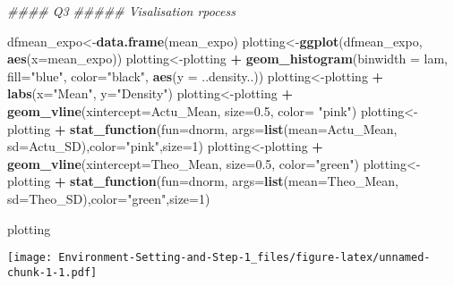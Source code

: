 \documentclass[
]{article}
\newenvironment{Shaded}{\begin{snugshade}}{\end{snugshade}}
\newcommand{\CommentTok}[1]{\textcolor[rgb]{0.56,0.35,0.01}{\textit{#1}}}
\newcommand{\DataTypeTok}[1]{\textcolor[rgb]{0.13,0.29,0.53}{#1}}
\newcommand{\DecValTok}[1]{\textcolor[rgb]{0.00,0.00,0.81}{#1}}
\newcommand{\FloatTok}[1]{\textcolor[rgb]{0.00,0.00,0.81}{#1}}
\newcommand{\KeywordTok}[1]{\textcolor[rgb]{0.13,0.29,0.53}{\textbf{#1}}}
\newcommand{\NormalTok}[1]{#1}
\newcommand{\OperatorTok}[1]{\textcolor[rgb]{0.81,0.36,0.00}{\textbf{#1}}}
\newcommand{\StringTok}[1]{\textcolor[rgb]{0.31,0.60,0.02}{#1}}
\begin{document}
\begin{Shaded}
\begin{Highlighting}[]
\CommentTok{#### Q3}
\CommentTok{##### Visalisation rpocess}

\NormalTok{dfmean_expo<-}\KeywordTok{data.frame}\NormalTok{(mean_expo)}
\NormalTok{plotting<-}\KeywordTok{ggplot}\NormalTok{(dfmean_expo, }\KeywordTok{aes}\NormalTok{(}\DataTypeTok{x=}\NormalTok{mean_expo))}
\NormalTok{plotting<-plotting }\OperatorTok{+}\StringTok{ }\KeywordTok{geom_histogram}\NormalTok{(}\DataTypeTok{binwidth =}\NormalTok{ lam, }\DataTypeTok{fill=}\StringTok{"blue"}\NormalTok{, }\DataTypeTok{color=}\StringTok{"black"}\NormalTok{, }\KeywordTok{aes}\NormalTok{(}\DataTypeTok{y =}\NormalTok{ ..density..))}
\NormalTok{plotting<-plotting }\OperatorTok{+}\StringTok{ }\KeywordTok{labs}\NormalTok{(}\DataTypeTok{x=}\StringTok{"Mean"}\NormalTok{, }\DataTypeTok{y=}\StringTok{"Density"}\NormalTok{)}
\NormalTok{plotting<-plotting }\OperatorTok{+}\StringTok{ }\KeywordTok{geom_vline}\NormalTok{(}\DataTypeTok{xintercept=}\NormalTok{Actu_Mean, }\DataTypeTok{size=}\FloatTok{0.5}\NormalTok{, }\DataTypeTok{color=} \StringTok{"pink"}\NormalTok{)}
\NormalTok{plotting<-plotting }\OperatorTok{+}\StringTok{ }\KeywordTok{stat_function}\NormalTok{(}\DataTypeTok{fun=}\NormalTok{dnorm, }\DataTypeTok{args=}\KeywordTok{list}\NormalTok{(}\DataTypeTok{mean=}\NormalTok{Actu_Mean, }\DataTypeTok{sd=}\NormalTok{Actu_SD),}\DataTypeTok{color=}\StringTok{"pink"}\NormalTok{,}\DataTypeTok{size=}\DecValTok{1}\NormalTok{)}
\NormalTok{plotting<-plotting }\OperatorTok{+}\StringTok{ }\KeywordTok{geom_vline}\NormalTok{(}\DataTypeTok{xintercept=}\NormalTok{Theo_Mean, }\DataTypeTok{size=}\FloatTok{0.5}\NormalTok{, }\DataTypeTok{color=}\StringTok{"green"}\NormalTok{)}
\NormalTok{plotting<-plotting }\OperatorTok{+}\StringTok{ }\KeywordTok{stat_function}\NormalTok{(}\DataTypeTok{fun=}\NormalTok{dnorm, }\DataTypeTok{args=}\KeywordTok{list}\NormalTok{(}\DataTypeTok{mean=}\NormalTok{Theo_Mean, }\DataTypeTok{sd=}\NormalTok{Theo_SD),}\DataTypeTok{color=}\StringTok{"green"}\NormalTok{,}\DataTypeTok{size=}\DecValTok{1}\NormalTok{)}

\NormalTok{plotting}
\end{Highlighting}
\end{Shaded}

\texttt{[image: Environment-Setting-and-Step-1\_files/figure-latex/unnamed-chunk-1-1.pdf]}
\end{document}

